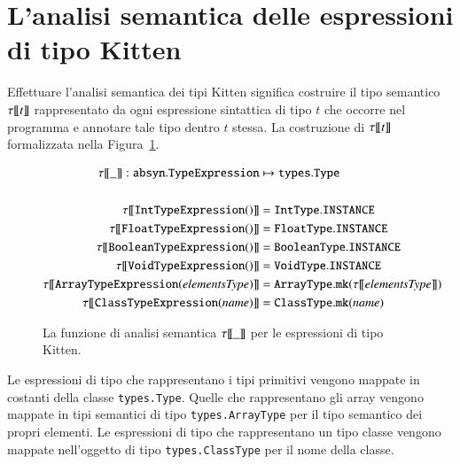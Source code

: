 \section{L'analisi semantica delle espressioni di tipo Kitten}\label{sec:analysis_types}
%
Effettuare l'analisi semantica dei tipi Kitten significa costruire il tipo
semantico ${\tau[\![{t}]\!]}$ rappresentato da ogni espressione sintattica di tipo $t$
che occorre nel programma e annotare tale tipo dentro $t$ stessa. La
costruzione di ${\tau[\![{t}]\!]}$ \e formalizzata nella Figura~\ref{fig:analysis_types}.
%
\begin{figure}[th]
\begin{align*}
  \st{\_}:\mathtt{absyn.TypeExpression}&\mapsto\mathtt{types.Type}\\
  \mbox{}\\
  \st{\mathtt{IntTypeExpression()}}&=\mathtt{IntType.INSTANCE}\\
  \st{\mathtt{FloatTypeExpression()}}&=\mathtt{FloatType.INSTANCE}\\
  \st{\mathtt{BooleanTypeExpression()}}&=\mathtt{BooleanType.INSTANCE}\\
  \st{\mathtt{VoidTypeExpression()}}&=\mathtt{VoidType.INSTANCE}\\
  \st{\mathtt{ArrayTypeExpression(\mathit{elementsType})}}
    &=\mathtt{ArrayType.mk(\st{\mathit{elementsType}})}\\
  \st{\mathtt{ClassTypeExpression(\mathit{name})}}
    &=\mathtt{ClassType.mk(\mathit{name})}
\end{align*}
\caption{La funzione di analisi semantica ${\tau[\![{\_}]\!]}$ per le espressioni di tipo Kitten.}\label{fig:analysis_types}
\end{figure}
%
Le espressioni di tipo che rappresentano i tipi primitivi
vengono mappate in costanti della classe
\texttt{types.Type}. Quelle che rappresentano gli array
vengono mappate in tipi semantici di tipo \texttt{types.ArrayType} per
il tipo semantico dei propri elementi.
Le espressioni di tipo che rappresentano un tipo classe vengono mappate
nell'oggetto di tipo \texttt{types.ClassType} per il nome della classe.

